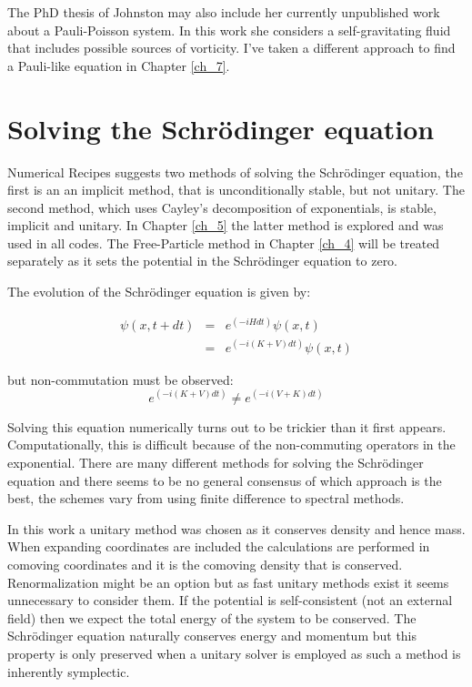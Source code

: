 The PhD thesis of Johnston may also include her currently unpublished work about a Pauli-Poisson system. In this work she considers a self-gravitating fluid that includes possible sources of vorticity. I've taken a different approach to find a Pauli-like equation in Chapter \ref{ch_7}.


\section{Solving the Schr\"odinger equation}
Numerical Recipes \citep{bib_nr} suggests two methods of solving the Schr\"odinger equation, the first is an an implicit method, that is unconditionally stable, but not unitary. The second method, which uses Cayley's decomposition of exponentials, is stable, implicit and unitary. In Chapter \ref{ch_5} the latter method is explored and was used in all codes. The Free-Particle method in Chapter \ref{ch_4} will be treated separately as it sets the potential in the Schr\"odinger equation to zero.

The evolution of the Schr\"odinger equation is given by:

\begin{eqnarray}
\label{sch_solve}
\psi(x, t+dt) &=& e^{(-iHdt)} \psi(x, t) \\
	&=& e^{(-i(K+V)dt)} \psi(x, t)
\end{eqnarray}

\noindent but non-commutation must be observed:
\begin{equation}
e^{(-i(K+V)dt)} \ne e^{(-i(V+K)dt)} 
\end{equation}

Solving this equation numerically turns out to be trickier than it first appears. Computationally, this is difficult because of the non-commuting operators in the exponential. There are many different methods for solving the Schr\"odinger equation and there seems to be no general consensus of which approach is the best, the schemes vary from using finite difference to spectral methods.

In this work a unitary method was chosen as it conserves density and hence mass. When expanding coordinates are included the calculations are performed in comoving coordinates and it is the comoving density that is conserved. Renormalization might be an option but as fast unitary methods exist it seems unnecessary to consider them. If the potential is self-consistent (not an external field) then we expect the total energy of the system to be conserved. The Schr\"odinger equation naturally conserves energy and momentum but this property is only preserved when a unitary solver is employed as such a method is inherently symplectic.

